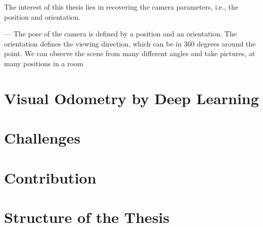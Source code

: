 		
		
		The interest of this thesis lies in recovering the camera parameters, i.e., the position and orientation.
		
	
	---
	The pose of the camera is defined by a position and an orientation.
	The orientation defines the viewing direction, which can be in 360 degrees around the point.
	We can observe the scene from many different angles and take pictures, at many positions in a room 
	
	\section{Visual Odometry by Deep Learning}
	
	
	
	\section{Challenges}
	
	\section{Contribution}
	
	\section{Structure of the Thesis}